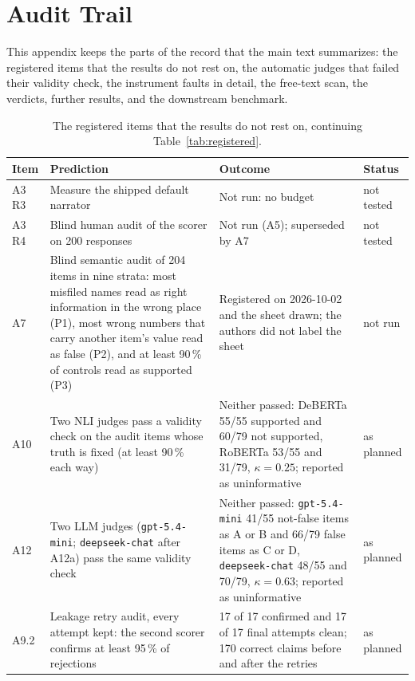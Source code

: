 \documentclass[10pt,twocolumn]{article}
\begin{document}
\appendix
\section{Audit Trail}\label{app:trail}
\renewcommand{\thetable}{A\arabic{table}}
\setcounter{table}{0}

This appendix keeps the parts of the record that the main text summarizes:
the registered items that the results do not rest on, the automatic judges
that failed their validity check, the instrument faults in detail, the
free-text scan, the verdicts, further results, and the downstream
benchmark.

\begin{table}[!tp]
\caption{The registered items that the results do not rest on, continuing
Table~\ref{tab:registered}.}
\label{tab:registered-more}
\centering
\footnotesize
\setlength{\tabcolsep}{2.4pt}
\begin{tabular}{@{}lp{5.4cm}p{8.9cm}l@{}}
\toprule
Item & Prediction & Outcome & Status \\
\midrule
A3 R3 & Measure the shipped default narrator & Not run: no budget & not tested \\
A3 R4 & Blind human audit of the scorer on 200 responses & Not run (A5); superseded by A7 & not tested \\
A7 & Blind semantic audit of 204 items in nine strata: most misfiled names read as right information in the wrong place (P1), most wrong numbers that carry another item's value read as false (P2), and at least 90\,\% of controls read as supported (P3) & Registered on 2026-10-02 and the sheet drawn; the authors did not label the sheet & not run \\
A10 & Two NLI judges pass a validity check on the audit items whose truth is fixed (at least 90\,\% each way) & Neither passed: DeBERTa 55/55 supported and 60/79 not supported, RoBERTa 53/55 and 31/79, $\kappa=0.25$; reported as uninformative & as planned \\
A12 & Two LLM judges (\texttt{gpt-5.4-mini}; \texttt{deepseek-chat} after A12a) pass the same validity check & Neither passed: \texttt{gpt-5.4-mini} 41/55 not-false items as A or B and 66/79 false items as C or D, \texttt{deepseek-chat} 48/55 and 70/79, $\kappa=0.63$; reported as uninformative & as planned \\
A9.2 & Leakage retry audit, every attempt kept: the second scorer confirms at least 95\,\% of rejections & 17 of 17 confirmed and 17 of 17 final attempts clean; 170 correct claims before and after the retries & as planned \\
\bottomrule
\end{tabular}
\end{table}
\end{document}
